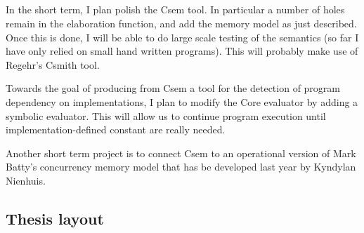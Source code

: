 \documentclass[11pt,a4paper, twocolumn]{article}
\begin{document}
\subsection*{}

In the short term, I plan polish the Csem tool. In particular a number
of holes remain in the elaboration function, and add the memory model
as just described. Once this is done, I will be able to do large scale
testing of the semantics (so far I have only relied on small hand
written programs). This will probably make use of Regehr's Csmith
tool.

Towards the goal of producing from Csem a tool for the detection of
program dependency on implementations, I plan to modify the Core
evaluator by adding a symbolic evaluator. This will allow us to
continue program execution until implementation-defined constant are
really needed.

Another short term project is to connect Csem to an operational
version of Mark Batty's concurrency memory model that has be developed
last year by Kyndylan Nienhuis.


\subsection*{Thesis layout}
\end{document}
